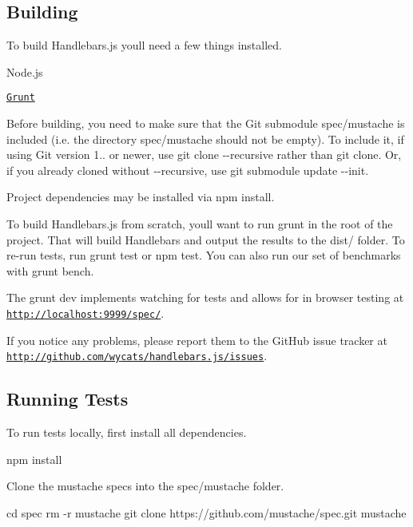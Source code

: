 \subsection*{Building}

To build Handlebars.\+js you\textquotesingle{}ll need a few things installed.


\begin{DoxyItemize}
\item Node.\+js
\item \href{http://gruntjs.com/getting-started}{\tt Grunt}
\end{DoxyItemize}

Before building, you need to make sure that the Git submodule {\ttfamily spec/mustache} is included (i.\+e. the directory {\ttfamily spec/mustache} should not be empty). To include it, if using Git version 1.. or newer, use {\ttfamily git clone -\/-\/recursive} rather than {\ttfamily git clone}. Or, if you already cloned without {\ttfamily -\/-\/recursive}, use {\ttfamily git submodule update -\/-\/init}.

Project dependencies may be installed via {\ttfamily npm install}.

To build Handlebars.\+js from scratch, you\textquotesingle{}ll want to run {\ttfamily grunt} in the root of the project. That will build Handlebars and output the results to the dist/ folder. To re-\/run tests, run {\ttfamily grunt test} or {\ttfamily npm test}. You can also run our set of benchmarks with {\ttfamily grunt bench}.

The {\ttfamily grunt dev} implements watching for tests and allows for in browser testing at {\ttfamily \href{http://localhost:9999/spec/}{\tt http\+://localhost\+:9999/spec/}}.

If you notice any problems, please report them to the Git\+Hub issue tracker at \href{http://github.com/wycats/handlebars.js/issues}{\tt http\+://github.\+com/wycats/handlebars.\+js/issues}.

\subsection*{Running Tests}

To run tests locally, first install all dependencies. 
\begin{DoxyCode}
npm install
\end{DoxyCode}


Clone the mustache specs into the spec/mustache folder. 
\begin{DoxyCode}
cd spec
rm -r mustache
git clone https://github.com/mustache/spec.git mustache
\end{DoxyCode}


